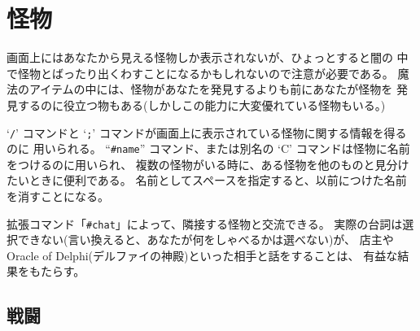 \section{怪物}

画面上にはあなたから見える怪物しか表示されないが、ひょっとすると闇の
中で怪物とばったり出くわすことになるかもしれないので注意が必要である。
魔法のアイテムの中には、怪物があなたを発見するよりも前にあなたが怪物を
発見するのに役立つ物もある(しかしこの能力に大変優れている怪物もいる。)

`{\tt /}' コマンドと `{\tt ;}' コマンドが画面上に表示されている怪物に関する情報を得るのに
用いられる。
``{\tt \#name}'' コマンド、または別名の `C' コマンドは怪物に名前をつけるのに用いられ、
複数の怪物がいる時に、ある怪物を他のものと見分けたいときに便利である。
名前としてスペースを指定すると、以前につけた名前を消すことになる。

拡張コマンド「{\tt \#chat}」によって、隣接する怪物と交流できる。
実際の台詞は選択できない(言い換えると、あなたが何をしゃべるかは選べない)が、
店主や Oracle of Delphi(デルファイの神殿)といった相手と話をすることは、
有益な結果をもたらす。


\subsection*{戦闘}

